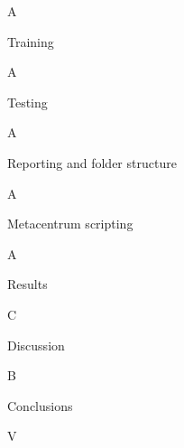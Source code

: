 A

\sec Training 

A

\sec Testing 

A

\sec Reporting and folder structure 

A

\sec Metacentrum scripting 

A

\chap Results

C

\chap Discussion

B

\chap Conclusions

V




\bye

